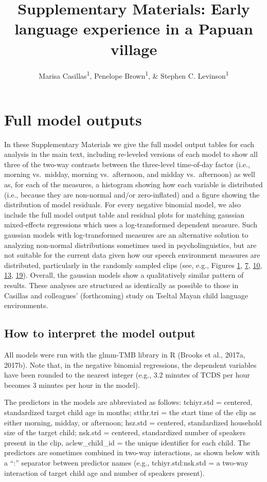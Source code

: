 \documentclass[,man,floatsintext]{apa6}
\title{Supplementary Materials: Early language experience in a Papuan village}
\author{Marisa Casillas\textsuperscript{1}, Penelope Brown\textsuperscript{1},
\& Stephen C. Levinson\textsuperscript{1}}
\date{}
\affiliation{
\vspace{0.5cm}
\textsuperscript{1} Max Planck Institute for Psycholinguistics}
\begin{document}
\maketitle

\section{Full model outputs}\label{models}

In these Supplementary Materials we give the full model output tables
for each analysis in the main text, including re-leveled versions of
each model to show all three of the two-way contrasts between the
three-level time-of-day factor (i.e., morning vs.~midday, morning
vs.~afternoon, and midday vs.~afternoon) as well as, for each of the
measures, a histogram showing how each variable is distributed (i.e.,
because they are non-normal and/or zero-inflated) and a figure showing
the distribution of model residuals. For every negative binomial model,
we also include the full model output table and residual plots for
matching gaussian mixed-effects regressions which uses a log-transformed
dependent measure. Such gaussian models with log-transformed measures
are an alternative solution to analyzing non-normal distributions
sometimes used in psycholinguistics, but are not suitable for the
current data given how our speech environment measures are distributed,
particularly in the randomly sampled clips (see, e.g., Figures
\protect\hyperlink{fig1}{1}, \protect\hyperlink{fig7}{7},
\protect\hyperlink{fig10}{10}, \protect\hyperlink{fig13}{13},
\protect\hyperlink{fig19}{19}). Overall, the gaussian models show a
qualitatively similar pattern of results. These analyses are structured
as identically as possible to those in Casillas and colleagues'
(forthcoming) study on Tseltal Mayan child language environments.

\subsection{How to interpret the model
output}\label{how-to-interpret-the-model-output}

All models were run with the glmm-TMB library in R (Brooks et al.,
2017a, 2017b). Note that, in the negative binomial regressions, the
dependent variables have been rounded to the nearest integer (e.g., 3.2
minutes of TCDS per hour becomes 3 minutes per hour in the model).

The predictors in the models are abbreviated as follows: tchiyr.std =
centered, standardized target child age in months; stthr.tri = the start
time of the clip as either morning, midday, or afternoon; hsz.std =
centered, standardized household size of the target child; nsk.std =
centered, standardized number of speakers present in the clip,
aclew\_child\_id = the unique identifier for each child. The predictors
are sometimes combined in two-way interactions, as shown below with a
\enquote{:} separator between predictor names (e.g., tchiyr.std:nsk.std
= a two-way interaction of target child age and number of speakers
present).
\end{document}
